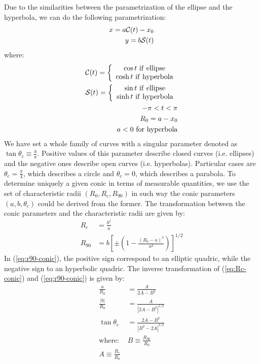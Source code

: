 Due to the similarities between the parametrization of the ellipse and the hyperbola, we can do the following parametrization:
\begin{align}
x = a\mathcal{C}(t)-x_0 \label{eq:par-x}\\ 
y = b\mathcal{S}(t) \label{eq:par-y}
\end{align}
where:
\begin{align}
\mathcal{C}(t) = \left\lbrace \begin{array}{c}
\cos t ~\mathrm{if~ellipse} \\
\cosh t ~\mathrm{if~hyperbola}
\end{array}\right.\\
\mathcal{S}(t) = \left\lbrace \begin{array}{c}
\sin t ~\mathrm{if~ellipse} \\
\sinh t ~\mathrm{if~hyperbola}
\end{array}\right. \\
-\pi < t < \pi \\
R_0 = a - x_0 \\
a<0 ~ \mathrm{for~hyperbola}
\end{align}
We have set a whole family of curves with a singular parameter denoted as $\tan\theta_c \equiv \frac{b}{a}$. Positive values of this parameter describe closed curves
(i.e. ellipses) and the negative ones describe open curves (i.e. hyperbolas). Particular cases are $\theta_c =\frac{\pi}{4}$, which describes a circle and $\theta_c=0$, which describes
a parabola.
To determine uniquely a given conic in terms of measurable quantities, we use the set of characteristic radii $(R_0,R_c,R_{90})$ in such way the conic parameters $(a,b,\theta_c)$
could be derived from the former. The transformation between the conic parameters and the characteristic radii are given by:
\begin{align}
R_c &= \frac{b^2}{a} \label{eq:Rc-conic}\\ 
R_{90} &= b\left[\pm\left(1 - \frac{(R_0-a)^2}{a^2}\right)\right]^{1/2}\label{eq:r90-conic}
\end{align}
In (\ref{eq:r90-conic}), the positive sign correspond to an elliptic quadric, while the negative sign to an hyperbolic quadric. The inverse transformation of (\ref{eq:Rc-conic})
and (\ref{eq:r90-conic}) is given by:
\begin{align}
\frac{a}{R_0} &= \frac{A}{2A-B^2} \label{eq:a-conic}\\
\frac{|b|}{R_0} &= \frac{A}{\left|2A-B^2\right|^{1/2}}\\
\tan\theta_c &= \frac{2A-B^2}{\left|B^2 - 2A\right|^{1/2}} \label{eq:thc-conic} \\
\mathrm{where:~}& B\equiv \frac{R_{90}}{R_0} \\
A \equiv \frac{R_c}{R_0}
\end{align}

